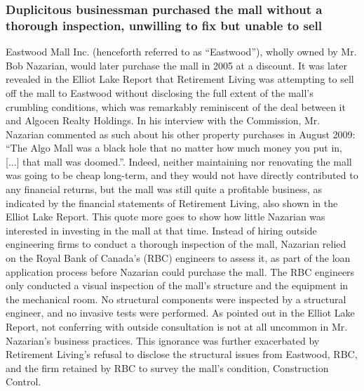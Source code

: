 \documentclass[12pt]{article}
\begin{document}
\subsubsection{Duplicitous businessman purchased the mall without a thorough inspection, unwilling to fix but unable to sell}

Eastwood Mall Inc. (henceforth referred to as ``Eastwood''), wholly owned by Mr. Bob Nazarian, would later purchase the mall in 2005 at a discount. It was later revealed in the Elliot Lake Report that Retirement Living was attempting to sell off the mall to Eastwood without disclosing the full extent of the mall's crumbling conditions, which was remarkably reminiscent of the deal between it and Algocen Realty Holdings. In his interview with the Commission, Mr. Nazarian commented as such about his other property purchases in August 2009: ``The Algo Mall was a black hole that no matter how much money you put in, [...] that mall was doomed.''\cite{AlgoLakeReport1}. Indeed, neither maintaining nor renovating the mall was going to be cheap long-term, and they would not have directly contributed to any financial returns, but the mall was still quite a profitable business, as indicated by the financial statements of Retirement Living, also shown in the Elliot Lake Report. This quote more goes to show how little Nazarian was interested in investing in the mall at that time. Instead of hiring outside engineering firms to conduct a thorough inspection of the mall, Nazarian relied on the Royal Bank of Canada's (RBC) engineers to assess it, as part of the loan application process before Nazarian could purchase the mall. The RBC engineers only conducted a visual inspection of the mall's structure and the equipment in the mechanical room. No structural components were inspected by a structural engineer, and no invasive tests were performed. As pointed out in the Elliot Lake Report, not conferring with outside consultation is not at all uncommon in Mr. Nazarian's business practices. This ignorance was further exacerbated by Retirement Living's refusal to disclose the structural issues from Eastwood, RBC, and the firm retained by RBC to survey the mall's condition, Construction Control. 
\end{document}
